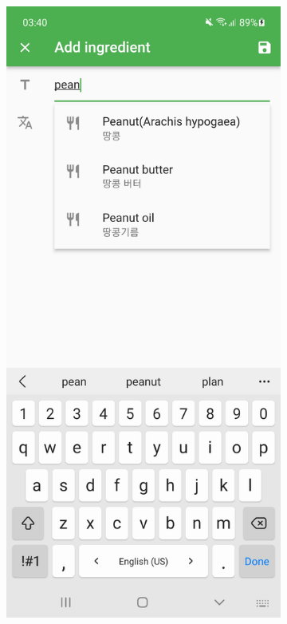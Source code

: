 \begin{figure}[h]
    \begin{subfigure}{0.5\textwidth}
        \centering
        \includegraphics[width=0.9\linewidth]{Figures/Screenshot/ingredients_autocomplete.jpg} 

\end{subfigure}
\end{figure}
